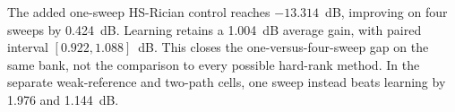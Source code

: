 The added one-sweep HS-Rician control reaches $-13.314$~dB,
improving on four sweeps by 0.424~dB. Learning retains a
1.004~dB average gain, with paired interval
$[0.922,1.088]$~dB. This closes the
one-versus-four-sweep gap on the same bank, not the comparison to every
possible hard-rank method. In the separate weak-reference and two-path
cells, one sweep instead beats learning by
1.976 and
1.144~dB.
